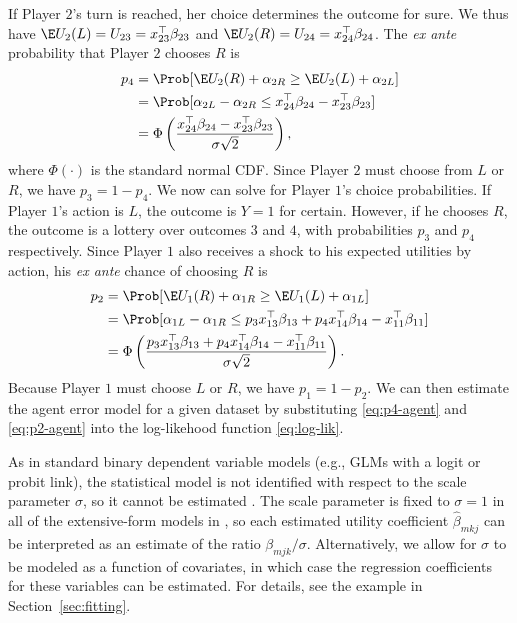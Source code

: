 \documentclass[article]{jss}
\begin{document}
If Player $2$'s turn is reached, her choice determines the outcome for sure.  We
thus have $\E U_2(L) = U_{23} = x_{23}^{\top} \beta_{23}$ and $\E U_2(R) =
U_{24} = x_{24}^{\top} \beta_{24}$.  The \textit{ex ante} probability that
Player $2$ chooses $R$ is
\begin{equation}
  \label{eq:p4-agent}
  \begin{aligned}
    p_4 &= \Prob[ \E U_2(R) + \alpha_{2R} \geq \E U_2(L) + \alpha_{2L}] \\
    &= \Prob [ \alpha_{2L} - \alpha_{2R} \leq x_{24}^{\top} \beta_{24} -
    x_{23}^{\top} \beta_{23} ] \\
    &= \Phi \left( \frac{x_{24}^{\top} \beta_{24} - x_{23}^{\top}
        \beta_{23}}{\sigma \sqrt{2}} \right),
  \end{aligned}
\end{equation}
where $\Phi(\cdot)$ is the standard normal CDF.  Since Player $2$ must choose
from $L$ or $R$, we have $p_3 = 1 - p_4$.  We now can solve for Player $1$'s
choice probabilities.  If Player $1$'s action is $L$, the outcome is $Y = 1$ for
certain.  However, if he chooses $R$, the outcome is a lottery over outcomes $3$
and $4$, with probabilities $p_3$ and $p_4$ respectively.  Since Player $1$ also
receives a shock to his expected utilities by action, his \textit{ex ante}
chance of choosing $R$ is
\begin{equation}
  \label{eq:p2-agent}
  \begin{aligned}
    p_2 &= \Prob[ \E U_1(R) + \alpha_{1R} \geq \E U_1(L) + \alpha_{1L}] \\
    &= \Prob [ \alpha_{1L} - \alpha_{1R} \leq p_3 x_{13}^{\top} \beta_{13} + p_4
    x_{14}^{\top} \beta_{14} - x_{11}^{\top} \beta_{11} ] \\
    &= \Phi \left(\frac{p_3 x_{13}^{\top} \beta_{13} + p_4 x_{14}^{\top}
        \beta_{14} - x_{11}^{\top} \beta_{11}}{\sigma \sqrt{2}} \right).
  \end{aligned}
\end{equation}
Because Player $1$ must choose $L$ or $R$, we have $p_1 = 1 - p_2$.  We can then
estimate the agent error model for a given dataset by substituting
\eqref{eq:p4-agent} and \eqref{eq:p2-agent} into the log-likehood function
\eqref{eq:log-lik}.

As in standard binary dependent variable models (e.g., GLMs with a logit or
probit link), the statistical model is not identified with respect to the scale
parameter $\sigma$, so it cannot be estimated \citep{Signorino1999,Lewis2003}.
The scale parameter is fixed to $\sigma = 1$ in all of the extensive-form models
in , so each estimated utility coefficient $\hat{\beta}_{mkj}$ can be
interpreted as an estimate of the ratio $\beta_{mjk} / \sigma$.  Alternatively,
we allow for $\sigma$ to be modeled as a function of covariates, in which case
the regression coefficients for these variables can be estimated.  For details,
see the example in Section~\ref{sec:fitting}.
\end{document}
